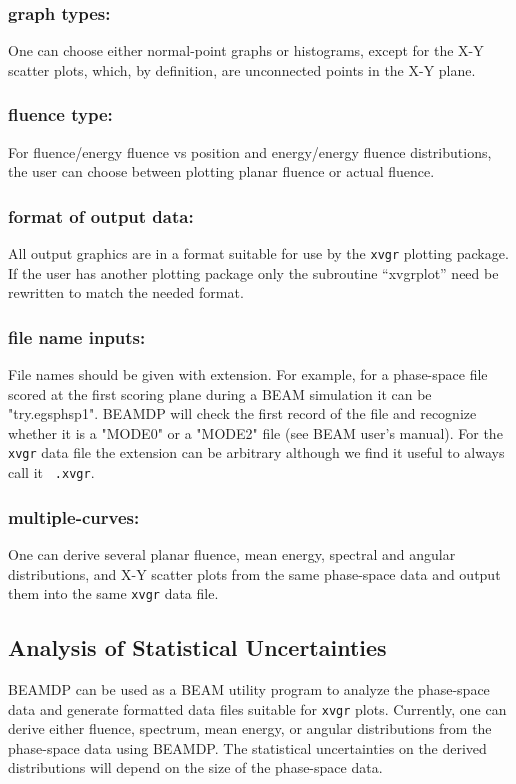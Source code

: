 \documentclass[12pt,twoside]{article}
\begin{document}
\noindent
\subsubsection{graph types:}
One can choose either normal-point graphs or histograms, except for the X-Y
scatter plots, which, by definition, are unconnected points in the X-Y plane.

\noindent
\subsubsection{fluence type:}
For fluence/energy fluence vs position and energy/energy fluence distributions,
the user can choose between plotting planar fluence or actual fluence.

\subsubsection{format of output data:}
All output graphics are in a format suitable for use by the \verb+xvgr+ plotting
package. If the user has another plotting package only the subroutine
``xvgrplot'' need be rewritten to match the needed format.

\subsubsection{file name inputs:}
File names should be given with extension. For example, for a phase-space
file scored at the first scoring plane during a BEAM simulation it can be
"try.egsphsp1". BEAMDP will check the first record of the file and
recognize whether it is a "MODE0" or a "MODE2" file (see BEAM user's
manual).  For the \verb+xvgr+ data file the extension can be arbitrary
although we find it useful to always call it \verb+ .xvgr+.

\subsubsection{multiple-curves:}
One can derive several planar fluence, mean energy, spectral and angular
distributions, and X-Y scatter plots from the same phase-space data and
output them into the same \verb+xvgr+ data file.

\subsection{Analysis of Statistical Uncertainties}

BEAMDP can be used as a BEAM utility program to analyze the phase-space
data and generate formatted data files suitable for \verb+xvgr+ plots.
Currently, one can derive either fluence, spectrum, mean energy, or
angular distributions from the phase-space data using BEAMDP.  The
statistical uncertainties on the derived distributions will depend on the
size of the phase-space data.\\
\end{document}
